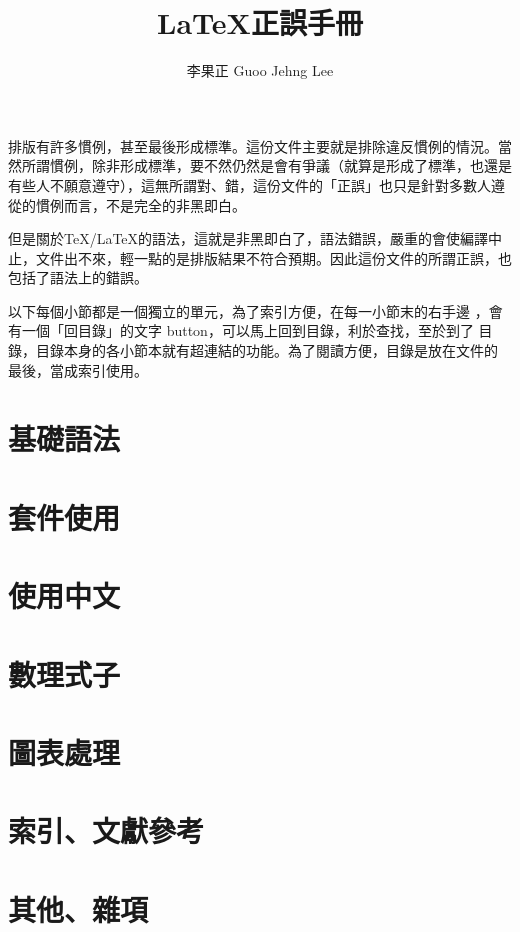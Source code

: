 \documentclass[11pt,a4paper]{article}
\title{\textsf{\textbf{\LaTeX \iyan 正誤手冊}}}
\author{\small 李果正 Guoo Jehng Lee}
\date{\small \zhtoday}
\begin{document}
\maketitle

排版有許多慣例，甚至最後形成標準。這份文件主要就是排除違反慣例的情況。當
然所謂慣例，除非形成標準，要不然仍然是會有爭議（就算是形成了標準，也還是
有些人不願意遵守），這無所謂對、錯，這份文件的「正誤」也只是針對多數人遵
從的慣例而言，不是完全的非黑即白。

但是關於\TeX/\LaTeX 的語法，這就是非黑即白了，語法錯誤，嚴重的會使編譯中
止，文件出不來，輕一點的是排版結果不符合預期。因此這份文件的所謂正誤，也
包括了語法上的錯誤。

以下每個小節都是一個獨立的單元，為了索引方便，在每一小節末的右手邊
，會有一個「回目錄」的文字 button，可以馬上回到目錄，利於查找，至於到了
目錄，目錄本身的各小節本就有超連結的功能。為了閱讀方便，目錄是放在文件的
最後，當成索引使用。

\section{基礎語法}
\label{sec:syntax}

  
  
  

\section{套件使用}
\label{sec:package}

  

\section{使用中文}
\label{sec:chinese}

\section{數理式子}
\label{sec:math}

  
  
  
  
  

\section{圖表處理}
\label{sec:figure}

\section{索引、文獻參考}
\label{sec:index}

\section{其他、雜項}
\label{sec:miscellaneous}

\clearpage
\hypertarget{contents}{}
\tableofcontents
\end{document}
